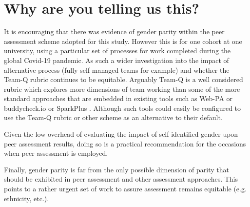 \documentclass[sigconf, anonymous=true]{acmart}
\begin{document}
\section{Why are you telling us this?}
It is encouraging that there was evidence of gender parity within the peer assessment scheme adopted for this study. However this is for one cohort at one university, using a particular set of processes for work completed during the global Covid-19 pandemic. As such a wider investigation into the impact of alternative process (fully self managed teams for example) and whether the Team-Q rubric continues to be equitable. Arguably Team-Q is a well considered rubric which explores more dimensions of team working than some of the more standard approaches that are embedded in existing tools such as Web-PA \cite{WebPA} or buddycheck.io \cite{BuddyCheck} or SparkPlus \cite{SparkPlus}. Although such tools could easily be configured to use the Team-Q rubric or other scheme as an alternative to their default.

Given the low overhead of evaluating the impact of self-identified gender upon peer assessment results, doing so is a practical recommendation for the occasions when peer assessment is employed.

Finally, gender parity is far from the only possible dimension of parity that should be exhibited in peer assessment and other assessment approaches. This points to a rather urgent set of work to assure assessment remains equitable (e.g. ethnicity, etc.). 


\end{document}
